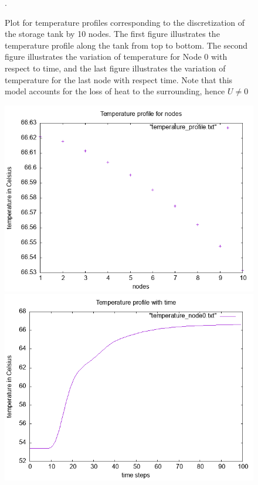 \documentclass{article}
\begin{document}
\begin{figure}[ht]
\caption{Plot for temperature profiles corresponding to the discretization of the storage tank by 10 nodes. The first figure illustrates the temperature profile along the tank from top to bottom. The second figure illustrates the variation of temperature for Node 0 with respect to time, and the last figure illustrates the variation of temperature for the last node with respect time. Note that this model accounts for the loss of heat to the surrounding, hence $U \neq 0$}.
\end{figure}

\begin{figure}[ht]
\centering
\includegraphics[scale = 0.5]{figures/temperature_profile_u_0.png}
\includegraphics[scale =0.5]{figures/temperature_node0_u_0.png}

\end{figure}
\end{document}
